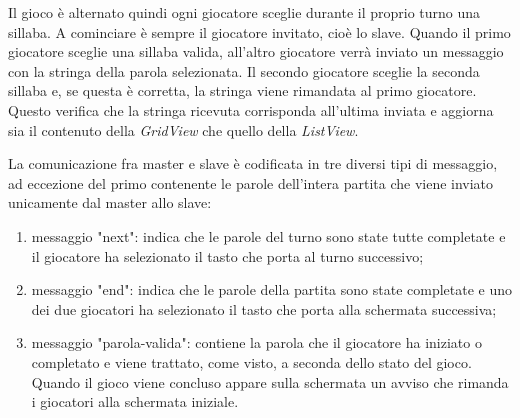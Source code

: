 
Il gioco è alternato quindi ogni giocatore sceglie durante il proprio turno una sillaba. A cominciare è sempre il giocatore invitato, cioè lo slave. Quando il primo giocatore sceglie una sillaba valida, all'altro giocatore verrà inviato un messaggio con la stringa della parola selezionata. Il secondo giocatore sceglie la seconda sillaba e, se questa è corretta, la stringa viene rimandata al primo giocatore. Questo verifica che la stringa ricevuta corrisponda all'ultima inviata e aggiorna sia il contenuto della \emph{GridView} che quello della \emph{ListView}.

La comunicazione fra master e slave è codificata in tre diversi tipi di
 messaggio, ad eccezione del primo contenente le parole dell'intera partita
 che viene inviato unicamente dal master allo slave:

\begin{enumerate}
\item messaggio "next": indica che le parole del turno sono state tutte completate e il giocatore ha selezionato il tasto che porta al turno successivo;
\item messaggio "end": indica che le parole della partita sono state completate e uno dei due giocatori ha selezionato il tasto che porta alla schermata successiva;
\item messaggio "parola-valida": contiene la parola che il giocatore ha iniziato o completato e viene trattato, come visto, a seconda dello stato del gioco. Quando il gioco viene concluso appare sulla schermata un avviso che rimanda i giocatori alla schermata iniziale.
\end{enumerate}
